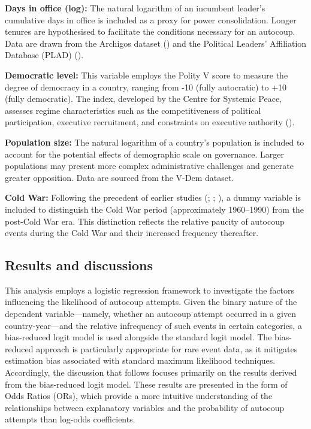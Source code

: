 \documentclass[
  12pt,
]{report}
\begin{document}
\textbf{Days in office (log):} The natural logarithm of an incumbent
leader's cumulative days in office is included as a proxy for power
consolidation. Longer tenures are hypothesised to facilitate the
conditions necessary for an autocoup. Data are drawn from the Archigos
dataset () and the Political Leaders' Affiliation Database (PLAD)
().

\textbf{Democratic level:} This variable employs the Polity V score to
measure the degree of democracy in a country, ranging from -10 (fully
autocratic) to +10 (fully democratic). The index, developed by the
Centre for Systemic Peace, assesses regime characteristics such as the
competitiveness of political participation, executive recruitment, and
constraints on executive authority ().

\textbf{Population size:} The natural logarithm of a country's
population is included to account for the potential effects of
demographic scale on governance. Larger populations may present more
complex administrative challenges and generate greater opposition. Data
are sourced from the V-Dem dataset.

\textbf{Cold War:} Following the precedent of earlier studies
(;
;
), a dummy variable is
included to distinguish the Cold War period (approximately 1960--1990)
from the post-Cold War era. This distinction reflects the relative
paucity of autocoup events during the Cold War and their increased
frequency thereafter.

\subsection*{Results and discussions}\label{results-and-discussions}

This analysis employs a logistic regression framework to investigate the
factors influencing the likelihood of autocoup attempts. Given the
binary nature of the dependent variable---namely, whether an autocoup
attempt occurred in a given country-year---and the relative infrequency
of such events in certain categories, a bias-reduced logit model is used
alongside the standard logit model. The bias-reduced approach is
particularly appropriate for rare event data, as it mitigates estimation
bias associated with standard maximum likelihood techniques.
Accordingly, the discussion that follows focuses primarily on the
results derived from the bias-reduced logit model. These results are
presented in the form of Odds Ratios (ORs), which provide a more
intuitive understanding of the relationships between explanatory
variables and the probability of autocoup attempts than log-odds
coefficients.
\end{document}
